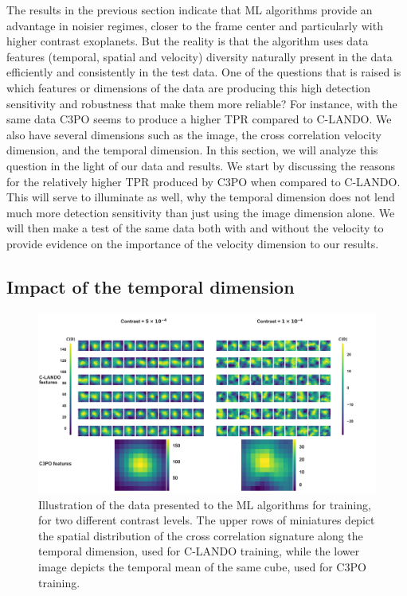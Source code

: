 \documentclass[referee]{aa} %
\begin{document}
The results in the previous section indicate that ML algorithms provide an advantage in noisier regimes, closer to the frame center and particularly with higher contrast exoplanets.
But the reality is that the algorithm uses data features (temporal, spatial and velocity) diversity naturally present in the data efficiently and consistently in the test data.
One of the questions that is raised is which features or dimensions of the data are producing this high detection sensitivity and robustness that make them more reliable?
For instance, with the same data C3PO seems to produce a higher TPR compared to C-LANDO.
We also have several dimensions such as the image, the cross correlation velocity dimension, and the temporal dimension.
In this section, we will analyze this question in the light of our data and results.
We start by discussing the reasons for the relatively higher TPR produced by C3PO when compared to C-LANDO.
This will serve to illuminate as well, why the temporal dimension does not lend much more detection sensitivity than just using the image dimension alone.
We will then make a test of the same data both with and without the velocity to provide evidence on the importance of the velocity dimension to our results.

\subsection{Impact of the temporal dimension}

\begin{figure}
\centering
\includegraphics[width=\textwidth]{fig5_disc_dec2023_cropped.png}
\caption{Illustration of the data presented to the ML algorithms for training, for two different contrast levels. The upper rows of miniatures depict the spatial distribution of the cross correlation signature along the temporal dimension, used for C-LANDO training, while the lower image depicts the temporal mean of the same cube, used for C3PO training. }
\label{fig:disc-part1}
\end{figure}
\end{document}
